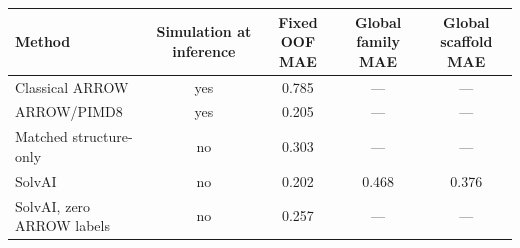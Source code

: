 \begin{tabular}{lcccc}
\toprule
Method & Simulation at inference & Fixed OOF MAE & Global family MAE & Global scaffold MAE \\
\midrule
Classical ARROW & yes & 0.785 & — & — \\
ARROW/PIMD8 & yes & 0.205 & — & — \\
Matched structure-only & no & 0.303 & — & — \\
SolvAI & no & 0.202 & 0.468 & 0.376 \\
SolvAI, zero ARROW labels & no & 0.257 & — & — \\
\bottomrule
\end{tabular}
